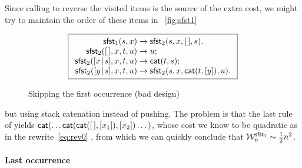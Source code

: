 Since calling  to reverse the
visited items is the source of the extra cost, we might try to
maintain the order of these items in \fig~\vref{fig:sfst1}
\begin{figure}[b]
\begin{equation*}
\boxed{%
\begin{array}{r@{\;}l@{\;}l}
\fun{sfst}_1(s,x)               & \rightarrow
                                & \fun{sfst}_2(s,x,\el,s).\\
\fun{sfst}_2(\el,x,t,u)         & \rightarrow & u;\\
\fun{sfst}_2(\cons{x}{s},x,t,u) & \rightarrow & \fun{cat}(t,s);\\
\fun{sfst}_2(\cons{y}{s},x,t,u) & \rightarrow
                                & \fun{sfst}_2(s,x,\fun{cat}(t,[y]),u).
\end{array}}
\end{equation*}
\caption{Skipping the first occurrence (bad design)
\label{fig:sfst1}}
\end{figure}
but using stack catenation instead of pushing. The problem is that the
last rule of 
 yields
\(\fun{cat}(\dots\fun{cat}(\fun{cat}(\el,[x_1]),[x_2])\dots)\), whose
cost we know to be quadratic  as in the
rewrite~\eqref{eq:rev0}
, from which we can
quickly conclude that \(\W{\fun{sfst}_1}{n} \sim \tfrac{1}{2}n^2\).

\paragraph{Last occurrence}


